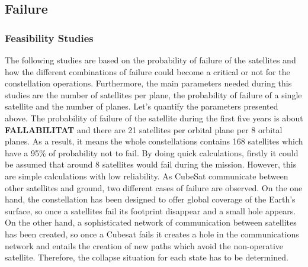 \subsection{Failure}

\subsubsection{Feasibility Studies}
The following studies are based on the probability of failure of the satellites and how the different combinations of failure could become a critical or not for the constellation operations. Furthermore, the main parameters needed during this studies are the number of satellites per plane, the probability of failure of a single satellite and the number of planes. 
\newline
\newline
Let's quantify the parameters presented above. The probability of failure of the satellite during the first five years is about \textbf{FALLABILITAT} and there are 21 satellites per orbital plane per 8 orbital planes. As a result, it means the whole constellations contains 168 satellites which have a 95\% of probability not to fail. By doing quick calculations, firstly it could be assumed that around 8 satellites would fail during the mission. However, this are simple calculations with low reliability.
\newline
\newline
As CubeSat communicate between other satellites and ground, two different cases of failure are observed. On the one hand, the constellation has been designed to offer global coverage of the Earth's surface, so once a satellites fail its footprint disappear and a small hole appears. On the other hand, a sophisticated network of communication between satellites has been created, so once a Cubesat fails it creates a hole in the communications network and entails the creation of new paths which avoid the non-operative satellite. Therefore, the collapse situation for each state has to be determined.
\newline
